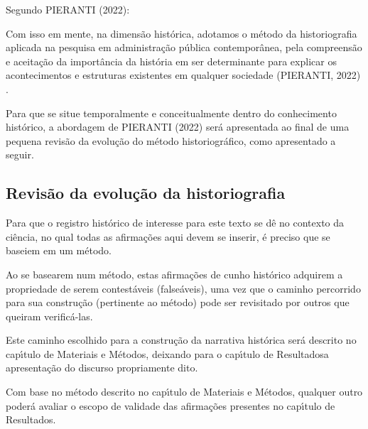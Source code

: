 \documentclass[
12pt,		%
openright,	%
twoside,  %
a4paper,			%
chapter=TITLE,		%
english,			%
french,				%
spanish,			%
brazil				%
]{USPSC-classe/USPSC}
\begin{document}
Segundo PIERANTI (2022):



\noindent\begin{center}\mbox{\centering{}}\end{center}





Com isso em mente, na dimens\~ao hist\'orica, adotamos o m\'etodo da historiografia aplicada na pesquisa em administra\c{c}\~ao p\'ublica contempor\^anea, pela compreens\~ao e aceita\c{c}\~ao da import\^ancia da hist\'oria em ser determinante para explicar os acontecimentos e estruturas existentes em qualquer sociedade (PIERANTI, 2022) .


Para que se situe temporalmente e conceitualmente dentro do conhecimento hist\'orico, a abordagem de  PIERANTI (2022) ser\'a apresentada ao final de uma pequena revis\~ao da evolu\c{c}\~ao do m\'etodo historiogr\'afico, como apresentado a seguir.


\subsection[Revis\~ao da evolu\c{c}\~ao da historiografia]{Revis\~ao da evolu\c{c}\~ao da historiografia}\label{Revis\~ao da evolu\c{c}\~ao da historiografia}
Para que o registro hist\'orico de interesse para este texto se d\^e no contexto da ci\^encia, no qual todas as afirma\c{c}\~oes aqui devem se inserir, \'e preciso que se baseiem em um m\'etodo.


Ao se basearem num m\'etodo, estas afirma\c{c}\~oes de cunho hist\'orico adquirem a propriedade de serem contest\'aveis (false\'aveis), uma vez que o caminho percorrido para sua constru\c{c}\~ao (pertinente ao m\'etodo) pode ser revisitado por outros que queiram verific\'a-las.


Este caminho escolhido para a constru\c{c}\~ao da narrativa hist\'orica ser\'a descrito no cap\'{\i}tulo de \textquotedbl Materiais e M\'etodos\textquotedbl , deixando para o cap\'{\i}tulo de \textquotedbl Resultados\textquotedbl  a apresenta\c{c}\~ao do discurso propriamente dito.


Com base no m\'etodo descrito no cap\'{\i}tulo de \textquotedbl Materiais e M\'etodos\textquotedbl , qualquer outro poder\'a avaliar o escopo de validade das afirma\c{c}\~oes presentes no cap\'{\i}tulo de \textquotedbl Resultados\textquotedbl .
\end{document}
